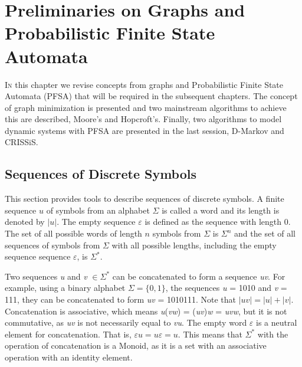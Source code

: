 \chapter{Preliminaries on Graphs and Probabilistic Finite State Automata}\label{cap:2}


{\lettrine[loversize=0.25,findent=0.2em,nindent=0em]{I}{n} this chapter we revise concepts from graphs and Probabilistic Finite State Automata (PFSA) that will be required in the subsequent chapters\cite{brianmarcus}\cite{vidal.05}. The concept of graph minimization is presented and two mainstream algorithms to achieve this are described, Moore's and Hopcroft's. Finally, two algorithms to model dynamic systems with PFSA are presented in the last session, D-Markov and CRISSiS.

\section{Sequences of Discrete Symbols}
This section provides tools to describe sequences of discrete symbols. A finite sequence $u$ of symbols from an alphabet $\Sigma$ is called a word and its length is denoted by $|\textit{u}|$. The empty sequence $\varepsilon$ is defined as the sequence with length 0. The set of all possible words of length $n$ symbols from $\Sigma$ is $\Sigma^n$ and the set of all sequences of symbols from $\Sigma$ with all possible lengths, including the empty sequence sequence $\varepsilon$, is $\Sigma^*$. 

Two sequences \textit{u} and \textit{v} $\in \Sigma^*$ can be concatenated to form a sequence \textit{uv}. For example, using a binary alphabet $\Sigma = \{0,1\}$, the sequences \textit{u} = 1010 and \textit{v} = 111, they can be concatenated to form \textit{uv} = 1010111. Note that $|\textit{uv}| = |\textit{u}| + |\textit{v}|$. Concatenation is associative, which means \textit{u}(\textit{vw}) = (\textit{uv})\textit{w} = \textit{uvw}, but it is not commutative, as \textit{uv} is not necessarily equal to \textit{vu}. The empty word $\varepsilon$ is a neutral element for concatenation. That is, $\varepsilon u = u\varepsilon = u$. This means that $\Sigma^*$ with the operation of concatenation is a Monoid, as it is a set with an associative operation with an identity element.

}
